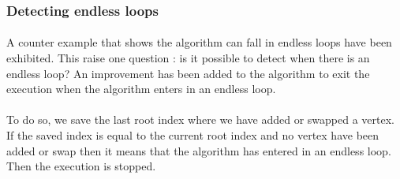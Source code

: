 \subsubsection{Detecting endless loops}
\paragraph{}
A counter example that shows the algorithm can fall in endless loops have been
exhibited. This raise one question : is it possible to detect when there is an
endless loop? An improvement has been added to the algorithm to exit the
execution when the algorithm enters in an endless loop.

\paragraph{}
To do so, we save the last root index where we have added or swapped a vertex. If
the saved index is equal to the current root index and no vertex have been
added or swap then it means that the algorithm has entered in an endless loop. Then
the execution is stopped.


\paragraph{}

